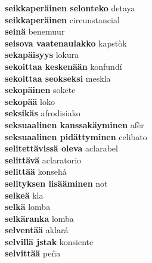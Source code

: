 \textbf{ seikkaperäinen selonteko  } detaya \\
\textbf{ seikkaperäinen  } circunstancial \\
\textbf{ seinä  } benemuur \\
\textbf{ seisova vaatenaulakko  } kapstòk \\
\textbf{ sekapäisyys  } lokura \\
\textbf{ sekoittaa keskenään  } konfundí \\
\textbf{ sekoittaa seokseksi  } meskla \\
\textbf{ sekopäinen  } sokete \\
\textbf{ sekopää  } loko \\
\textbf{ seksikäs  } afrodisiako \\
\textbf{ seksuaalinen kanssakäyminen  } afèr \\
\textbf{ seksuaalinen pidättyminen  } celibato \\
\textbf{ selitettävissä oleva  } aclarabel \\
\textbf{ selittävä  } aclaratorio \\
\textbf{ selittää  } konsehá \\
\textbf{ selityksen lisääminen  } not \\
\textbf{ selkeä  } kla \\
\textbf{ selkä  } lomba \\
\textbf{ selkäranka  } lomba \\
\textbf{ selventää  } aklará \\
\textbf{ selvillä jstak  } konsiente \\
\textbf{ selvittää  } peña \\
